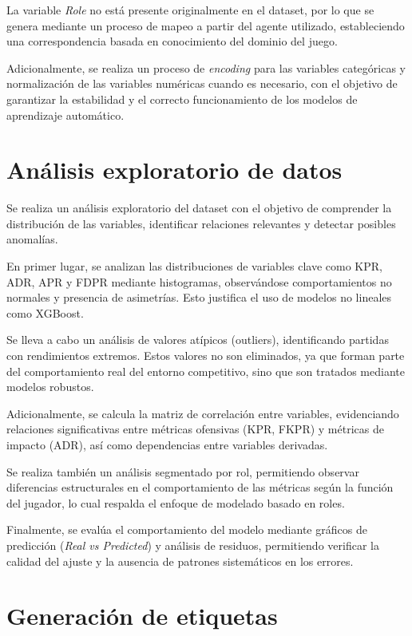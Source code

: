 \documentclass{ULBreport} %
\begin{document}
La variable \textit{Role} no está presente originalmente en el dataset, por lo que se genera mediante un proceso de mapeo a partir del agente utilizado, estableciendo una correspondencia basada en conocimiento del dominio del juego.

Adicionalmente, se realiza un proceso de \textit{encoding} para las variables categóricas y normalización de las variables numéricas cuando es necesario, con el objetivo de garantizar la estabilidad y el correcto funcionamiento de los modelos de aprendizaje automático.

\section{Análisis exploratorio de datos}

Se realiza un análisis exploratorio del dataset con el objetivo de comprender la distribución de las variables, identificar relaciones relevantes y detectar posibles anomalías.

En primer lugar, se analizan las distribuciones de variables clave como KPR, ADR, APR y FDPR mediante histogramas, observándose comportamientos no normales y presencia de asimetrías. Esto justifica el uso de modelos no lineales como XGBoost.

Se lleva a cabo un análisis de valores atípicos (outliers), identificando partidas con rendimientos extremos. Estos valores no son eliminados, ya que forman parte del comportamiento real del entorno competitivo, sino que son tratados mediante modelos robustos.

Adicionalmente, se calcula la matriz de correlación entre variables, evidenciando relaciones significativas entre métricas ofensivas (KPR, FKPR) y métricas de impacto (ADR), así como dependencias entre variables derivadas.

Se realiza también un análisis segmentado por rol, permitiendo observar diferencias estructurales en el comportamiento de las métricas según la función del jugador, lo cual respalda el enfoque de modelado basado en roles.

Finalmente, se evalúa el comportamiento del modelo mediante gráficos de predicción (\textit{Real vs Predicted}) y análisis de residuos, permitiendo verificar la calidad del ajuste y la ausencia de patrones sistemáticos en los errores.

\section{Generación de etiquetas}
\end{document}
